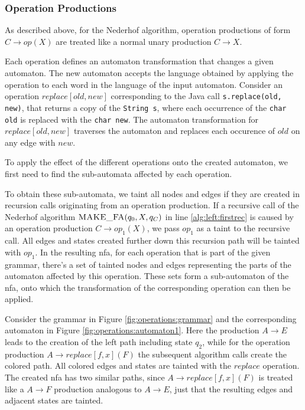 \subsubsection{Operation Productions}\label{opProduction}

As described above, for the Nederhof algorithm, operation productions of form $C \rightarrow op(X)$ are treated like a normal unary production $C \rightarrow X$.

Each operation defines an automaton transformation that changes a given automaton.
The new automaton accepts the language obtained by applying the operation to each word in the language of the input automaton.
Consider an operation $replace[old, new]$ corresponding to the Java call \lstinline|s.replace(old, new)|, that returns a copy of the \lstinline|String s|, where each occurrence of the \lstinline|char old| is replaced with the \lstinline|char new|.
The automaton transformation for $replace[old, new]$ traverses the automaton and replaces each occurence of $old$ on any edge with $new$.

To apply the effect of the different operations onto the created automaton, we first need to find the sub-automata affected by each operation.

To obtain these sub-automata, we taint all nodes and edges if they are created in recursion calls originating from an operation production. 
If a recursive call of the Nederhof algorithm $\textproc{MAKE\_FA}(q_0, X, q_C)$ in line \ref{alg:left:firstrec} is caused by an operation production $C \rightarrow op_1(X)$, we pass $op_1$ as a taint to the recursive call. All edges and states created further down this recursion path will be tainted with $op_1$. In the resulting \ac{nfa}, for each operation that is part of the given grammar, there's a set of tainted nodes and edges representing the parts of the automaton affected by this operation. These sets form a sub-automaton of the \ac{nfa}, onto which the transformation of the corresponding operation can then be applied.

Consider the grammar in Figure \ref{fig:operations:grammar} and the corresponding automaton in Figure \ref{fig:operations:automaton1}. Here the production $A \rightarrow E$ leads to the creation of the left path including state $q_2$, while for the operation production $A \rightarrow replace[f,x](F)$ the subsequent algorithm calls create the colored path. All colored edges and states are tainted with the $replace$ operation. The created \ac{nfa} has two similar paths, since $A \rightarrow replace[f,x](F)$ is treated like a $A \rightarrow F$ production analogous to $A \rightarrow E$, just that the resulting edges and adjacent states are tainted.

